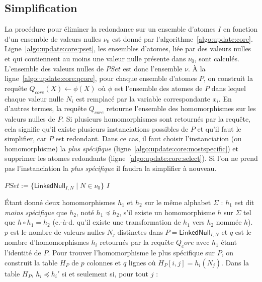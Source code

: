 \subsection{Simplification}
La procédure pour éliminer la redondance sur un ensemble d'atomes $I$ en fonction d'un ensemble de valeurs nulles $\nu_0$ est donné par l'algorithme~\ref{algo:update:core}.
Ligne~\ref{algo:update:core:pset}, les ensembles d'atomes, liée par des valeurs nulles et qui contiennent au moins une valeur nulle présente dans $\nu_0$, sont calculés.
L'ensemble des valeurs nulles de $PSet$ est donc l'ensemble $\nu$.
À la ligne~\ref{algo:update:core:qcore}, pour chaque ensemble d'atomes $P$, on construit la requête $Q_{core}(X) \gets \phi(X)$ où $\phi$ est l'ensemble des atomes de $P$ dans lequel chaque valeur nulle $N_i$ est remplacé par la variable correspondante $x_i$.
En d'autres termes, la requête $Q_{core}$ retourne l'ensemble des homomorphismes sur les valeurs nulles de $P$.
Si plusieurs homomorphismes sont retournés par la requête, cela signifie qu'il existe plusieurs instanciations possibles de $P$ et qu'il faut le simplifier, car $P$ est redondant.
Dans ce cas, il faut choisir l'instanciation (ou homomorphisme) la \textit{plus spécifique} (ligne~\ref{algo:update:core:mostspecific}) et supprimer les atomes redondants (ligne~\ref{algo:update:core:select}).
Si l'on ne prend pas l'instanciation la \textit{plus spécifique} il faudra la simplifier à nouveau.

\begin{algorithm}[ht]
	\caption{$\textsc{Simplify}(I, \nu_0)$}
    \label{algo:update:core}
	$PSet := \{\textsf{LinkedNull}_{I,N} \mid N \in \nu_0\}$\; \label{algo:update:core:pset}
	\Return $I$\;
\end{algorithm}

Étant donné deux homomorphismes $h_1$ et $h_2$ sur le même alphabet $\Sigma$ : $h_1$ est dit \textit{moins spécifique} que $h_2$, noté $h_1 \preceq h_2$, s'il existe un homomorphisme $h$ sur $\Sigma$ tel que $h \circ h_1 = h_2$ (c.-à-d. qu'il existe une transformation de $h_1$ vers $h_2$ nommée $h$).
$p$ est le nombre de valeurs nulles $N_j$ distinctes dans $P = \textsf{LinkedNull}_{I,N}$ et $q$ est le nombre d'homomorphismes $h_i$ retournés par la requête $Q_core$ avec $h_1$ étant l'identité de $P$.
Pour trouver l'homomorphisme le plus spécifique sur $P$, on construit la table $H_P$ de $p$ colonnes et $q$ lignes où $H_P[i, j] = h_i(N_j)$.
Dans la table $H_P$, $h_i \preceq h_i'$ si et seulement si, pour tout $j$ :


